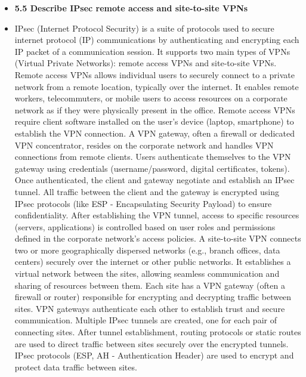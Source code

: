 \documentclass{article}
\begin{document}
\begin{itemize}
  \item \textbf{5.5 Describe IPsec remote access and site-to-site VPNs}
  	\item[] IPsec (Internet Protocol Security) is a suite of protocols used to secure internet protocol (IP) communications by authenticating and encrypting each IP packet of a communication session. It supports two main types of VPNs (Virtual Private Networks): remote access VPNs and site-to-site VPNs. Remote access VPNs allows individual users to securely connect to a private network from a remote location, typically over the internet. It enables remote workers, telecommuters, or mobile users to access resources on a corporate network as if they were physically present in the office. Remote access VPNs require client software installed on the user's device (laptop, smartphone) to establish the VPN connection. A VPN gateway, often a firewall or dedicated VPN concentrator, resides on the corporate network and handles VPN connections from remote clients. Users authenticate themselves to the VPN gateway using credentials (username/password, digital certificates, tokens). Once authenticated, the client and gateway negotiate and establish an IPsec tunnel. All traffic between the client and the gateway is encrypted using IPsec protocols (like ESP - Encapsulating Security Payload) to ensure confidentiality. After establishing the VPN tunnel, access to specific resources (servers, applications) is controlled based on user roles and permissions defined in the corporate network's access policies. A site-to-site VPN connects two or more geographically dispersed networks (e.g., branch offices, data centers) securely over the internet or other public networks. It establishes a virtual network between the sites, allowing seamless communication and sharing of resources between them. Each site has a VPN gateway (often a firewall or router) responsible for encrypting and decrypting traffic between sites. VPN gateways authenticate each other to establish trust and secure communication. Multiple IPsec tunnels are created, one for each pair of connecting sites. After tunnel establishment, routing protocols or static routes are used to direct traffic between sites securely over the encrypted tunnels. IPsec protocols (ESP, AH - Authentication Header) are used to encrypt and protect data traffic between sites.
  

\end{itemize}
\end{document}
